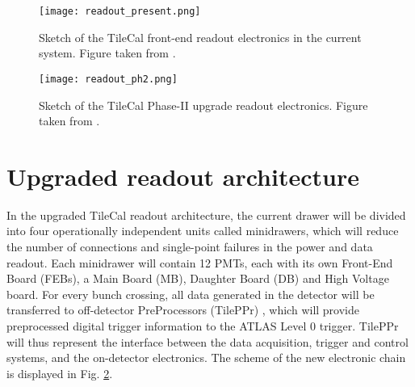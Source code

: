 \documentclass[10pt]{article}
\begin{document}
\begin{figure}[h]
\centering
\begin{minipage}[c]{0.85\textwidth}
\texttt{[image: readout\_present.png]}
\end{minipage}
\caption{Sketch of the TileCal front-end readout electronics in the current system. Figure taken from \cite{ele}.}
\label{fig:figure1}
\end{figure}

\begin{figure}[h]
\centering
\begin{minipage}[c]{0.85\textwidth}
\texttt{[image: readout\_ph2.png]}
\end{minipage}
\caption{Sketch of the TileCal Phase-II upgrade readout electronics. Figure taken from \cite{ele}.}
\label{fig:figure2}
\end{figure}

\section{Upgraded readout architecture}
In the upgraded TileCal readout architecture, the current drawer will be divided into four operationally independent units called minidrawers, which will reduce the number of connections and single-point failures in the power and data readout. Each minidrawer will contain 12 PMTs, each with its own Front-End Board (FEBs), a Main Board (MB), Daughter Board (DB) and High Voltage board. 
For every bunch crossing, all data generated in the detector will be transferred to off-detector PreProcessors (TilePPr) \cite{4}, which will provide preprocessed digital trigger information to the ATLAS Level 0 trigger. 
TilePPr will thus represent the interface between the data acquisition, trigger and control systems, and the on-detector electronics. 
The scheme of the new electronic chain is displayed in Fig. \ref{fig:figure2}.
\end{document}
